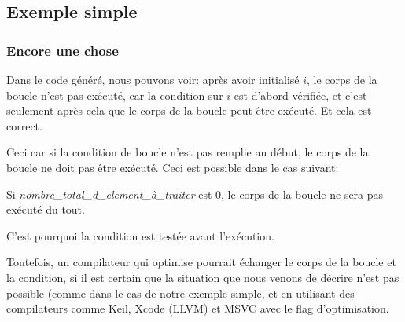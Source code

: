 \subsection{Exemple simple}





\subsubsection{Encore une chose}

Dans le code généré, nous pouvons voir:
après avoir initialisé $i$, le corps de la boucle n'est pas exécuté, car la condition
sur $i$ est d'abord vérifiée, et c'est seulement après cela que le corps de la boucle
peut être exécuté.
Et cela est correct.

Ceci car si la condition de boucle n'est pas remplie au début, le corps de la boucle
ne doit pas être exécuté.
Ceci est possible dans le cas suivant:



Si \emph{nombre\_total\_d\_element\_à\_traiter} est 0, le corps de la boucle ne sera
pas exécuté du tout.

C'est pourquoi la condition est testée avant l'exécution.

Toutefois, un compilateur qui optimise pourrait échanger le corps de la boucle et
la condition, si il est certain que la situation que nous venons de décrire n'est
pas possible (comme dans le cas de notre exemple simple, et en utilisant des compilateurs
comme Keil, Xcode (LLVM) et MSVC avec le flag d'optimisation.
